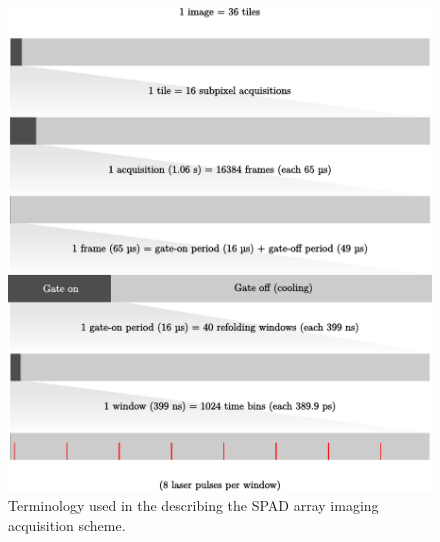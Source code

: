 \begin{figure}[h!]
\centerline{\includegraphics[width=15cm]{figure-first-spad-terms.pdf}}
\caption{Terminology used in the describing the SPAD array imaging acquisition scheme.}
\label{figure:first-spad-terms}
\end{figure}

